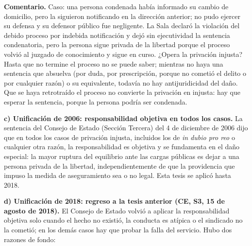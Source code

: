 \begin{comentario}
\textcolor[HTML]{8A6D3B}{\textbf{Comentario. }}Caso: una persona condenada había informado su cambio de domicilio, pero la siguieron notificando en la dirección anterior; no pudo ejercer su defensa y su defensor público fue negligente. La Sala declaró la violación del debido proceso por indebida notificación y dejó sin ejecutividad la sentencia condenatoria, pero la persona sigue privada de la libertad porque el proceso volvió al juzgado de conocimiento y sigue en curso. ¿Opera la privación injusta? Hasta que no termine el proceso no se puede saber; mientras no haya una sentencia que absuelva (por duda, por prescripción, porque no cometió el delito o por cualquier razón) o su equivalente, todavía no hay antijuridicidad del daño. Que se haya retrotraído el proceso no convierte la privación en injusta: hay que esperar la sentencia, porque la persona podría ser condenada.
\end{comentario}
\textbf{c) Unificación de 2006: responsabilidad objetiva en todos los casos.} La sentencia del Consejo de Estado (Sección Tercera) del 4 de diciembre de 2006 dijo que en todos los casos de privación injusta, incluidos los de \textit{in dubio pro reo} o cualquier otra razón, la responsabilidad es objetiva y se fundamenta en el daño especial: la mayor ruptura del equilibrio ante las cargas públicas es dejar a una persona privada de la libertad, independientemente de que la providencia que impuso la medida de aseguramiento sea o no legal. Esta tesis se aplicó hasta 2018.

\textbf{d) Unificación de 2018: regreso a la tesis anterior (CE, S3, 15 de agosto de 2018).} El Consejo de Estado volvió a aplicar la responsabilidad objetiva solo cuando el hecho no existió, la conducta es atípica o el sindicado no la cometió; en los demás casos hay que probar la falla del servicio. Hubo dos razones de fondo:

